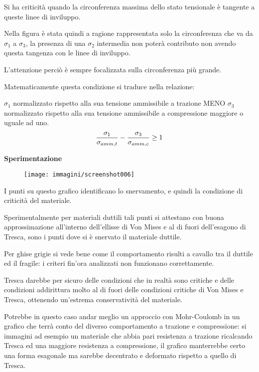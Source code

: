 \documentclass{article}
\begin{document}
\begin{adjustwidth}{2in}{}
 		Si ha criticità quando la circonferenza massima dello stato tensionale è tangente a queste linee di inviluppo. 
 		
 		Nella figura è stata quindi a ragione rappresentata solo la circonferenza che va da $\sigma_1$ a $\sigma_3$, la presenza di una $\sigma_2$ intermedia non poterà contributo non avendo questa tangenza con le linee di inviluppo. 
 		
 		L'attenzione perciò è sempre focalizzata sulla circonferenza più grande. \newline 
 		
 		Matematicamente questa condizione si traduce nella relazione: 
 		
 		$\sigma_1$ normalizzato rispetto alla sua tensione ammissibile a trazione MENO $\sigma_3$ normalizzato rispetto alla sua tensione ammissibile a compressione maggiore o uguale ad uno.
 		\[{\sigma_1\over\sigma_{amm,t}} - {\sigma_3\over\sigma_{amm,c}}\geq 1\]
 		
 		\textbf{{\Large Sperimentazione}} \newline 
 		\begin{figure}[H]
 			\centering
 			\texttt{[image: immagini/screenshot006]}
 			\label{fig:screenshot006}
 		\end{figure}
 		
 		
 		I punti su questo grafico identificano lo snervamento, e quindi la condizione di criticità del materiale. 
 		
 	 	Sperimentalmente per materiali duttili tali punti si attestano con buona approssimazione all'interno dell'ellisse di Von Mises e al di fuori dell'esagono di Tresca, sono i punti dove si è snervato il materiale duttile. \newline 
 		
 		Per ghise grigie si vede bene come il comportamento risulti a cavallo tra il duttile ed il fragile: i criteri fin'ora analizzati non funzionano correttamente.
 		
 		Tresca darebbe per sicuro delle condizioni che in realtà sono critiche e delle condizioni addirittura molto al di fuori delle condizioni critiche di Von Mises e Tresca, ottenendo un'estrema conservatività del materiale. 
 		
 		Potrebbe in questo caso andar meglio un approccio con Mohr-Coulomb in un grafico che terrà conto del diverso comportamento a trazione e compressione: si immagini ad esempio un materiale che abbia pari resistenza a trazione ricalcando Tresca ed una maggiore resistenza a compressione, il grafico manterrebbe certo una forma esagonale ma sarebbe decentrato e deformato rispetto a quello di Tresca.
 		

\end{adjustwidth}
\end{document}
